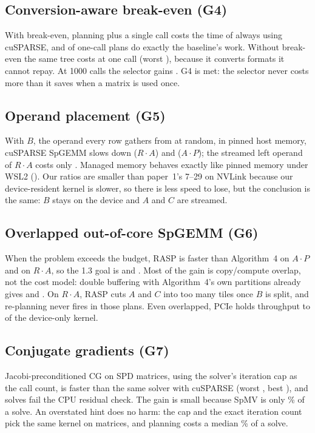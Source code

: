 \subsection{Conversion-aware break-even (G4)}\label{sec:res-g4}
With break-even, planning plus a single call costs \x{} the time of always using cuSPARSE, and
 of  one-call plans do exactly the baseline's work. Without break-even the same
tree costs \x{} at one call (worst \x), because it converts formats
it cannot repay. At 1000 calls the selector gains \x. G4 is met: the selector never costs more than
it saves when a matrix is used once.

\subsection{Operand placement (G5)}\label{sec:res-g5}
With $B$, the operand every row gathers from at random, in pinned host memory, cuSPARSE SpGEMM slows down
\x{} ($R\cdot A$) and \x{} ($A\cdot P$); the streamed left operand of
$R\cdot A$ costs only \x. Managed memory behaves exactly like pinned memory under WSL2
(\x). Our ratios are smaller than paper~1's 7--29\x{} on NVLink because our device-resident
kernel is slower, so there is less speed to lose, but the conclusion is the same: $B$ stays on the device and $A$
and $C$ are streamed.

\subsection{Overlapped out-of-core SpGEMM (G6)}\label{sec:res-g6}
When the problem exceeds the budget, RASP is \x{} faster than Algorithm~4 on $A\cdot P$ and
\x{} on $R\cdot A$, so the 1.3\x{} goal is  and . Most of the gain is
copy/compute overlap, not the cost model: double buffering with Algorithm~4's own partitions already gives
\x{} and \x. On $R\cdot A$, RASP cuts $A$ and $C$
into too many tiles once $B$ is split, and re-planning never fires in those plans. Even overlapped, PCIe holds
throughput to  of the device-only kernel.

\subsection{Conjugate gradients (G7)}\label{sec:res-cg}
Jacobi-preconditioned CG on  SPD matrices, using the solver's iteration cap as the call count, is
\x{} faster than the same solver with cuSPARSE (worst \x, best
\x), and  solves fail the CPU residual check. The gain is small because SpMV
is only \% of a solve. An overstated hint does no harm: the cap and the exact iteration count
pick the same kernel on  matrices, and planning costs a median \% of a
solve.


